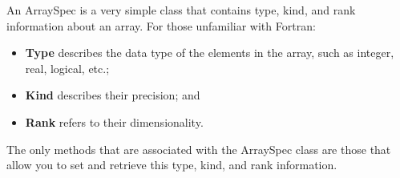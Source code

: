 
An ArraySpec is a very simple class that contains 
type, kind, and rank information about an array.  For those 
unfamiliar with Fortran:
\begin{itemize}
\item {\bf Type} describes the data type of the elements in the array, 
such as integer, real, logical, etc.;
\item {\bf Kind} describes their precision; and
\item {\bf Rank} refers to their dimensionality.
\end{itemize}

The only methods that are associated with the ArraySpec class are those 
that allow you to set and retrieve this type, kind, and rank information.







